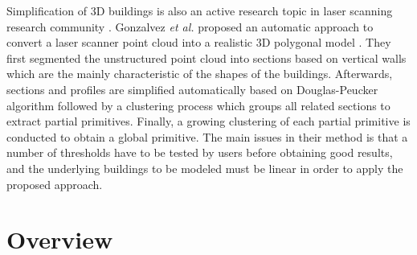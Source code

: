 \documentclass[10pt,journal,cspaper,compsoc]{IEEEtran}
\begin{document}
Simplification of 3D buildings is also an active research topic in
laser scanning research community \cite{LS_GAL,WDD_BBH,LS_BH}.
Gonzalvez {\it et al.} proposed an automatic approach to convert 
a laser scanner point cloud into a realistic 3D polygonal model \cite{LS_GAL}.
They first segmented the unstructured point cloud into sections 
based on vertical walls which are the 
mainly characteristic of the shapes of the buildings.
Afterwards, sections and profiles are simplified automatically
based on Douglas-Peucker algorithm followed by a clustering process 
which groups all related sections to extract partial primitives.
Finally, a growing clustering of each partial primitive is conducted
to obtain a global primitive.
The main issues in their method is that a number of thresholds
have to be tested by users before obtaining good results,
and the underlying buildings to be modeled must be linear 
in order to apply the proposed approach.


\section{Overview}
\end{document}
